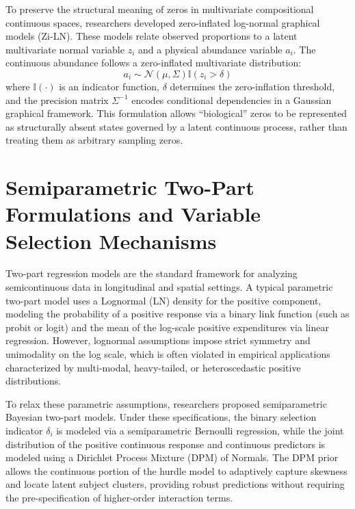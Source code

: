 \documentclass[11pt, a4paper]{article}
\begin{document}
To preserve the structural meaning of zeros in multivariate compositional continuous spaces, researchers developed zero-inflated log-normal graphical models (Zi-LN).\cite{fang2015, kurtz2015} These models relate observed proportions to a latent multivariate normal variable $z_i$ and a physical abundance variable $a_i$.\cite{fang2015, kurtz2015} The continuous abundance follows a zero-inflated multivariate distribution:
\begin{equation}
a_i \sim \mathcal{N}(\mu, \Sigma) \mathbb{I}(z_i > \delta)
\end{equation}
where $\mathbb{I}(\cdot)$ is an indicator function, $\delta$ determines the zero-inflation threshold, and the precision matrix $\Sigma^{-1}$ encodes conditional dependencies in a Gaussian graphical framework.\cite{fang2015, kurtz2015} This formulation allows ``biological'' zeros to be represented as structurally absent states governed by a latent continuous process, rather than treating them as arbitrary sampling zeros.\cite{kurtz2015}


\section{Semiparametric Two-Part Formulations and Variable Selection Mechanisms}

Two-part regression models are the standard framework for analyzing semicontinuous data in longitudinal and spatial settings.\cite{olsen2001, tooze2002, neelon2010} A typical parametric two-part model uses a Lognormal (LN) density for the positive component, modeling the probability of a positive response via a binary link function (such as probit or logit) and the mean of the log-scale positive expenditures via linear regression.\cite{olsen2001, neelon2010} However, lognormal assumptions impose strict symmetry and unimodality on the log scale, which is often violated in empirical applications characterized by multi-modal, heavy-tailed, or heteroscedastic positive distributions.\cite{olsen2001, manning2001} 

To relax these parametric assumptions, researchers proposed semiparametric Bayesian two-part models.\cite{olsen2001, neelon2010, muller2004} Under these specifications, the binary selection indicator $\delta_i$ is modeled via a semiparametric Bernoulli regression, while the joint distribution of the positive continuous response and continuous predictors is modeled using a Dirichlet Process Mixture (DPM) of Normals.\cite{neelon2010, muller2004, manning2001} The DPM prior allows the continuous portion of the hurdle model to adaptively capture skewness and locate latent subject clusters, providing robust predictions without requiring the pre-specification of higher-order interaction terms.\cite{neelon2010, muller2004}
\end{document}

